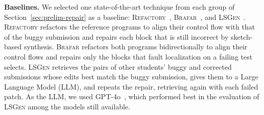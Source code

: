 \documentclass[10pt,conference]{IEEEtran}
\begin{document}
\textbf{Baselines.} We selected one state-of-the-art technique from each group of Section~\ref{sec:prelim-repair} as a baseline: \textsc{Refactory}~\cite{hu2019re}, \textsc{Brafar}~\cite{xie2024brafar}, and \textsc{LSGen}~\cite{dai2026learner}. \textsc{Refactory} refactors the reference programs to align their control flow with that of the buggy submission and repairs each block that is still incorrect by sketch-based synthesis. \textsc{Brafar} refactors both programs bidirectionally to align their control flows and repairs only the blocks that fault localization on a failing test selects. \textsc{LSGen} retrieves the pairs of other students' buggy and corrected submissions whose edits best match the buggy submission, gives them to a Large Language Model (LLM), and repeats the repair, retrieving again with each failed patch. As the LLM, we used GPT-4o~\cite{hurst2024gpt}, which performed best in the evaluation of \textsc{LSGen} among the models still available.
\end{document}
